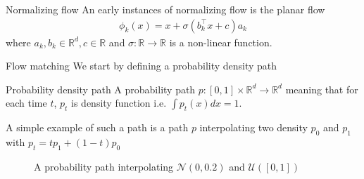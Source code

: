 \documentclass{beamer}
\begin{document}
\begin{frame}{Normalizing flow}
    An early instances  of normalizing flow is the planar flow 
    \begin{align*}
        \phi_k(x)=x+\sigma(b_k^\intercal x+c)a_k
    \end{align*}
    where \(a_k,b_k\in\mathbb{R}^d, c\in\mathbb{R}\) and  \(\sigma:\mathbb{R}\rightarrow\mathbb{R}\) is a non-linear function.
\end{frame}

\begin{frame}{Flow matching}
    We start by defining a probability density path
    \begin{block}{Probability density path}
        A probability path \(p:[0,1]\times\mathbb{R}^d\rightarrow\mathbb{R}^d\) meaning that for each time \(t\), \(p_t\) is density function i.e. \(\int p_t(x)dx=1\).\\
    \end{block}
    A simple example of such a path is a path \(p\) interpolating two density \(p_0\) and \(p_1\) with \(p_t=tp_1+(1-t)p_0\)
    \begin{figure}[htbp]
        \centering
        \caption{A probability path interpolating $\mathcal{N}(0,0.2)$ and $\mathcal{U}([0,1])$}
    \end{figure}
\end{frame}
\end{document}
